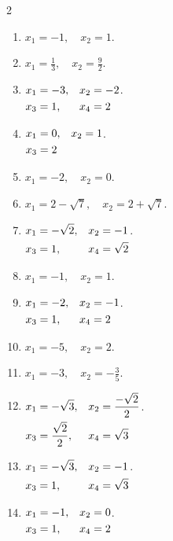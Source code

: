 \documentclass[11pt,a4paper]{article}
\begin{document}
\begin{multicols}{2}
\begin{enumerate}
\item \(\displaystyle x_{1}=-1,\quad x_{2}=1\).
\item \(\displaystyle x_{1}=\frac{1}{3},\quad x_{2}=\frac{9}{2}\).
\item \(\displaystyle \begin{alignedat}[t]{2}x_{1}&=-3,\quad &x_{2}&=-2\\x_{3}&=1,\quad &x_{4}&=2\end{alignedat}\).
\item \(\displaystyle \begin{alignedat}[t]{2}x_{1}&=0,\quad &x_{2}&=1\\x_{3}&=2\end{alignedat}\).
\item \(\displaystyle x_{1}=-2,\quad x_{2}=0\).
\item \(\displaystyle x_{1}=2-\sqrt{7},\quad x_{2}=2+\sqrt{7}\).
\item \(\displaystyle \begin{alignedat}[t]{2}x_{1}&=-\sqrt{2},\quad &x_{2}&=-1\\x_{3}&=1,\quad &x_{4}&=\sqrt{2}\end{alignedat}\).
\item \(\displaystyle x_{1}=-1,\quad x_{2}=1\).
\item \(\displaystyle \begin{alignedat}[t]{2}x_{1}&=-2,\quad &x_{2}&=-1\\x_{3}&=1,\quad &x_{4}&=2\end{alignedat}\).
\item \(\displaystyle x_{1}=-5,\quad x_{2}=2\).
\item \(\displaystyle x_{1}=-3,\quad x_{2}=-\frac{3}{5}\).
\item \(\displaystyle \begin{alignedat}[t]{2}x_{1}&=-\sqrt{3},\quad &x_{2}&=\frac{-\sqrt{2}}{2}\\x_{3}&=\frac{\sqrt{2}}{2},\quad &x_{4}&=\sqrt{3}\end{alignedat}\).
\item \(\displaystyle \begin{alignedat}[t]{2}x_{1}&=-\sqrt{3},\quad &x_{2}&=-1\\x_{3}&=1,\quad &x_{4}&=\sqrt{3}\end{alignedat}\).
\item \(\displaystyle \begin{alignedat}[t]{2}x_{1}&=-1,\quad &x_{2}&=0\\x_{3}&=1,\quad &x_{4}&=2\end{alignedat}\).

\end{enumerate}
\end{multicols}
\end{document}
